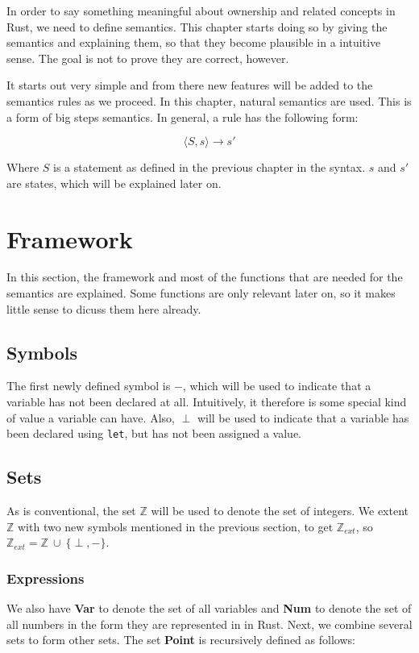 In order to say something meaningful about ownership and related concepts in Rust, we need to define semantics. This chapter starts doing so by giving the semantics and explaining them, so that they become plausible in a intuitive sense. The goal is not to prove they are correct, however.

It starts out very simple and from there new features will be added to the semantics rules as we proceed. In this chapter, natural semantics are used. This is a form of big steps semantics. In general, a rule has the following form:

$$\langle S, s \rangle \to s'$$

Where $S$ is a statement as defined in the previous chapter in the syntax. $s$ and $s'$ are states, which will be explained later on. 

\section{Framework}
In this section, the framework and most of the functions that are needed for the semantics are explained. Some functions are only relevant later on, so it makes little sense to dicuss them here already. 

\subsection{Symbols}
The first newly defined symbol is $-$, which will be used to indicate that a variable has not been declared at all. Intuitively, it therefore is some special kind of value a variable can have. Also, $\perp$ will be used to indicate that a variable has been declared using \verb|let|, but has not been assigned a value.

\subsection{Sets}
As is conventional, the set $\mathbb{Z}$ will be used to denote the set of integers. We extent $\mathbb{Z}$ with two new symbols mentioned in the previous section, to get $\mathbb{Z}_{ext}$, so $\mathbb{Z}_{ext} = \mathbb{Z} ~\cup ~ \{\perp, -\}$. 

\subsubsection{Expressions}
We also have \textbf{Var} to denote the set of all variables and \textbf{Num} to denote the set of all numbers in the form they are represented in in Rust. Next, we combine several sets to form other sets. The set \textbf{Point} is recursively defined as follows:

